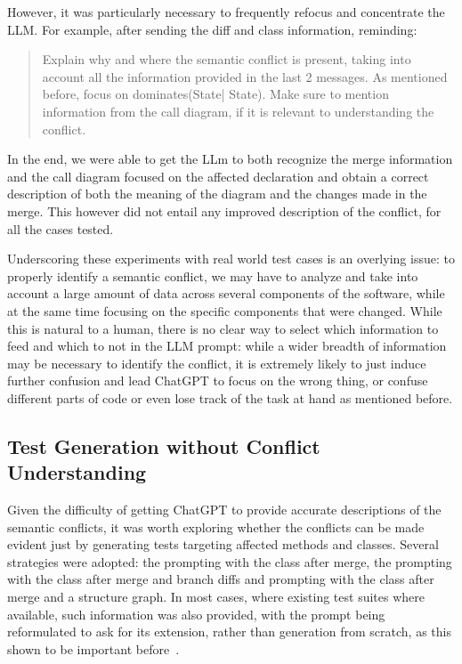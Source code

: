 However, it was particularly necessary to frequently refocus and concentrate the LLM. For example, after sending the diff and class information, reminding:

\begin{quote}
Explain why and where the semantic conflict is present, taking into account all the information provided in the last 2 messages. As mentioned before, focus on dominates(State| State). Make sure to mention information from the call diagram, if it is relevant to understanding the conflict.
\end{quote}

In the end, we were able to get the LLm to both recognize the merge information and the call diagram focused on the affected declaration and obtain a correct description of both the meaning of the diagram and the changes made in the merge. This however did not entail any improved description of the conflict, for all the cases tested.

Underscoring these experiments with real world test cases is an overlying issue: to properly identify a semantic conflict, we may have to analyze and take into account a large amount of data across several components of the software, while at the same time focusing on the specific components that were changed. While this is natural to a human, there is no clear way to select which information to feed and which to not in the LLM prompt: while a wider breadth of information may be necessary to identify the conflict, it is extremely likely to just induce further confusion and lead ChatGPT to focus on the wrong thing, or confuse different parts of code or even lose track of the task at hand as mentioned before.

\subsection{Test Generation without Conflict Understanding}

Given the difficulty of getting ChatGPT to provide accurate descriptions of the semantic conflicts, it was worth exploring whether the conflicts can be made evident just by generating tests targeting affected methods and classes. Several strategies were adopted: the prompting with the class after merge, the prompting with the class after merge and branch diffs and prompting with the class after merge and a structure graph. In most cases, where existing test suites where available, such information was also provided, with the prompt being reformulated to ask for its extension, rather than generation from scratch, as this shown to be important before~\cite{kn:githubcopilot}.

